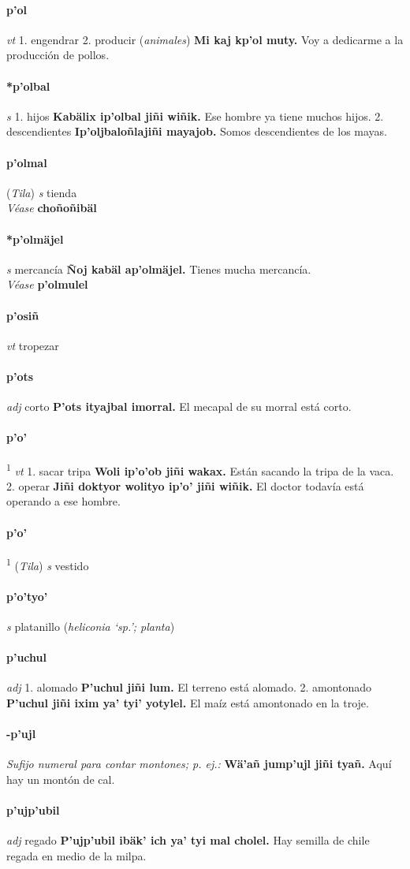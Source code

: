 \documentclass{scrbook}
\newcommand{\entry}[1]{\paragraph{#1}}
\newcommand{\onedefinition}[1]{#1.}
\newcommand{\defsuperscript}[1]{\textsuperscript{1}}
\newcommand{\nontranslationdef}[1]{\textit{#1}}
\newcommand{\partofspeech}[1]{\textit{#1}}
\newcommand{\spanishtranslation}[1]{#1}
\newcommand{\clarification}[1]{(\textit{#1})}
\newcommand{\cholexample}[1]{\textbf{#1}}
\newcommand{\exampletranslation}[1]{#1}
\newcommand{\alsosee}[1]{\\\textit{Véase} \textbf{#1}}
\newcommand{\relevantdialect}[1]{(\textit{#1})}
\begin{document}
\begin{multicols}{2}
\entry{p'ol}
\partofspeech{vt}
\onedefinition{1}
\spanishtranslation{engendrar}
\onedefinition{2}
\spanishtranslation{producir}
\clarification{animales}
\cholexample{Mi kaj kp'ol muty.}
\exampletranslation{Voy a dedicarme a la producción de pollos.}

\entry{*p'olbal}
\partofspeech{s}
\onedefinition{1}
\spanishtranslation{hijos}
\cholexample{Kabälix ip'olbal jiñi wiñik.}
\exampletranslation{Ese hombre ya tiene muchos hijos.}
\onedefinition{2}
\spanishtranslation{descendientes}
\cholexample{Ip'oljbaloñlajiñi mayajob.}
\exampletranslation{Somos descendientes de los mayas.}

\entry{p'olmal}
\relevantdialect{Tila}
\partofspeech{s}
\spanishtranslation{tienda}
\alsosee{choñoñibäl}

\entry{*p'olmäjel}
\partofspeech{s}
\spanishtranslation{mercancía}
\cholexample{Ñoj kabäl ap'olmäjel.}
\exampletranslation{Tienes mucha mercancía.}
\alsosee{p'olmulel}

\entry{p'osiñ}
\partofspeech{vt}
\spanishtranslation{tropezar}

\entry{p'ots}
\partofspeech{adj}
\spanishtranslation{corto}
\cholexample{P'ots ityajbal imorral.}
\exampletranslation{El mecapal de su morral está corto.}

\entry{p'o'}
\defsuperscript{1}
\partofspeech{vt}
\onedefinition{1}
\spanishtranslation{sacar tripa}
\cholexample{Woli ip'o'ob jiñi wakax.}
\exampletranslation{Están sacando la tripa de la vaca.}
\onedefinition{2}
\spanishtranslation{operar}
\cholexample{Jiñi doktyor wolityo ip'o' jiñi wiñik.}
\exampletranslation{El doctor todavía está operando a ese hombre.}

\entry{p'o'}
\defsuperscript{2}
\relevantdialect{Tila}
\partofspeech{s}
\spanishtranslation{vestido}

\entry{p'o'tyo'}
\partofspeech{s}
\spanishtranslation{platanillo}
\clarification{heliconia ‘sp.’; planta}

\entry{p'uchul}
\partofspeech{adj}
\onedefinition{1}
\spanishtranslation{alomado}
\cholexample{P'uchul jiñi lum.}
\exampletranslation{El terreno está alomado.}
\onedefinition{2}
\spanishtranslation{amontonado}
\cholexample{P'uchul jiñi ixim ya' tyi' yotylel.}
\exampletranslation{El maíz está amontonado en la troje.}

\entry{-p'ujl}
\nontranslationdef{Sufijo numeral para contar montones; p. ej.:}
\cholexample{Wä'añ jump'ujl jiñi tyañ.}
\exampletranslation{Aquí hay un montón de cal.}

\entry{p'ujp'ubil}
\partofspeech{adj}
\spanishtranslation{regado}
\cholexample{P'ujp'ubil ibäk' ich ya' tyi mal cholel.}
\exampletranslation{Hay semilla de chile regada en medio de la milpa.}


\end{multicols}
\end{document}
